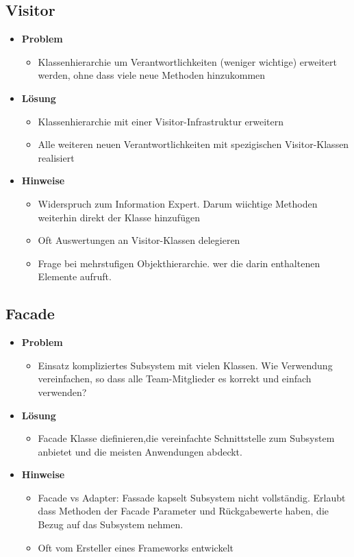 \documentclass[../ZF_SWEN1.tex]{subfiles}
\begin{document}
\subsection{Visitor}
\begin{itemize}
	\item \textbf{Problem}
	\begin{itemize}
		\item Klassenhierarchie um Verantwortlichkeiten (weniger wichtige) erweitert werden, ohne dass viele neue Methoden hinzukommen
	\end{itemize}
	\item \textbf{Lösung}
	\begin{itemize}
		\item Klassenhierarchie mit einer Visitor-Infrastruktur erweitern
		\item Alle weiteren neuen Verantwortlichkeiten mit spezigischen Visitor-Klassen realisiert
	\end{itemize}
	\item \textbf{Hinweise}
	\begin{itemize}
		\item Widerspruch zum Information Expert. Darum wiichtige Methoden weiterhin direkt der Klasse hinzufügen
		\item Oft Auswertungen an Visitor-Klassen delegieren
		\item Frage bei mehrstufigen Objekthierarchie. wer die darin enthaltenen Elemente aufruft.
	\end{itemize}
\end{itemize}



\subsection{Facade}
\begin{itemize}
	\item \textbf{Problem}
	\begin{itemize}
		\item Einsatz kompliziertes Subsystem mit vielen Klassen. Wie Verwendung vereinfachen, so dass alle Team-Mitglieder es korrekt und einfach verwenden?
	\end{itemize}
	\item \textbf{Lösung}
	\begin{itemize}
		\item Facade Klasse diefinieren,die vereinfachte Schnittstelle zum Subsystem anbietet und die meisten Anwendungen abdeckt.
	\end{itemize}
	\item \textbf{Hinweise}
	\begin{itemize}
		\item Facade vs Adapter: Fassade kapselt Subsystem nicht vollständig. Erlaubt dass Methoden der Facade Parameter und Rückgabewerte haben, die Bezug auf das Subsystem nehmen.
		\item Oft vom Ersteller eines Frameworks entwickelt
	\end{itemize}
\end{itemize}
\end{document}
